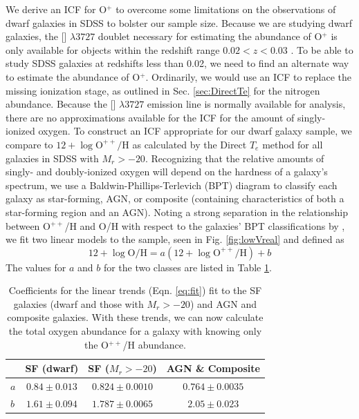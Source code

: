 We derive an ICF for O$^+$ to overcome some limitations on the observations of 
dwarf galaxies in SDSS to bolster our sample size.  Because we are studying 
dwarf galaxies, the [] $\lambda 3727$ doublet necessary for estimating 
the abundance of O$^+$ is only available for objects within the redshift range 
$0.02 < z < 0.03$ \citep[see Sec. \ref{sec:SDSS_limits_P3} and][for more 
details]{Douglass17a}.  To be able to study SDSS galaxies at redshifts less than 
0.02, we need to find an alternate way to estimate the abundance of O$^+$.  
Ordinarily, we would use an ICF to replace the missing ionization stage, as 
outlined in Sec. \ref{sec:DirectTe} for the nitrogen abundance.  Because the 
[] $\lambda 3727$ emission line is normally available for analysis, 
there are no approximations available for the ICF for the amount of 
singly-ionized oxygen.  To construct an ICF appropriate for our dwarf galaxy 
sample, we compare \OH to $12 + \log{\text{O}^{++}/\text{H}}$ as calculated by 
the Direct $T_e$ method for all galaxies in SDSS with $M_r > -20$.  Recognizing 
that the relative amounts of singly- and doubly-ionized oxygen will depend on 
the hardness of a galaxy's spectrum, we use a Baldwin-Phillips-Terlevich (BPT) 
diagram \citep{Baldwin81} to classify each galaxy as star-forming, AGN, or 
composite (containing characteristics of both a star-forming region and an AGN).  
Noting a strong separation in the relationship between O$^{++}$/H and O/H with 
respect to the galaxies' BPT classifications by \cite{Brinchmann04}, we fit two 
linear models to the sample, seen in Fig. \ref{fig:lowVreal} and defined as 
\begin{equation}\label{eq:fit}
    12 + \log{\text{O}/\text{H}} = a(12 + \log{\text{O}^{++}/\text{H}}) + b
\end{equation}
The values for $a$ and $b$ for the two classes are listed in Table \ref{tab:ab}.



\begin{table}
\centering

    \begin{tabular}{l|c|c|c}
         & SF (dwarf) & SF ($M_r > -20$) & AGN \& Composite\\
        \hline
        $a$ & $0.84 \pm 0.013$ & $0.824 \pm 0.0010$ & $0.764 \pm 0.0035$\\
        $b$ & $1.61 \pm 0.094$ & $1.787 \pm 0.0065$ & $2.05 \pm 0.023$
    \end{tabular}
    
    \caption[Coefficients of oxygen abundance fits]{Coefficients for the linear 
    trends (Eqn. \ref{eq:fit}) fit to the SF galaxies (dwarf and those with 
    $M_r > -20$) and AGN and composite galaxies.  With these trends, we can now 
    calculate the total oxygen abundance for a galaxy with knowing only the 
    O$^{++}$/H abundance.}
    
    \label{tab:ab}
    
\end{table}



